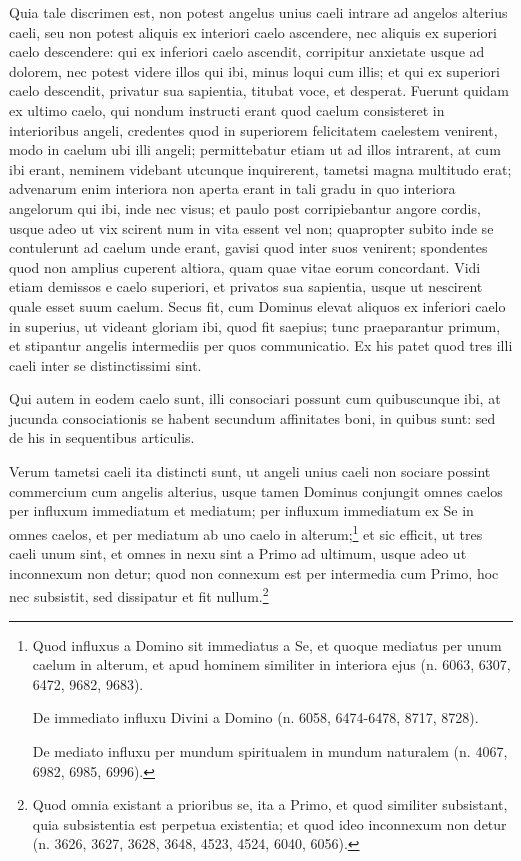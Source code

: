 \begin{topic}{35}
    Quia tale discrimen est, non potest angelus unius caeli intrare ad angelos alterius caeli, seu non potest aliquis ex
    interiori caelo ascendere, nec aliquis ex superiori caelo descendere: qui ex inferiori caelo ascendit, corripitur
    anxietate usque ad dolorem, nec potest videre illos qui ibi, minus loqui cum illis; et qui ex superiori caelo
    descendit, privatur sua sapientia, titubat voce, et desperat.
    Fuerunt quidam ex ultimo caelo, qui nondum instructi erant quod caelum consisteret in interioribus angeli, credentes
    quod in superiorem felicitatem caelestem venirent, modo in caelum ubi illi angeli; permittebatur etiam ut ad illos
    intrarent, at cum ibi erant, neminem videbant utcunque inquirerent, tametsi magna multitudo erat; advenarum enim
    interiora non aperta erant in tali gradu in quo interiora angelorum qui ibi, inde nec visus; et paulo post
    corripiebantur angore cordis, usque adeo ut vix scirent num in vita essent vel non; quapropter subito inde se
    contulerunt ad caelum unde erant, gavisi quod inter suos venirent; spondentes quod non amplius cuperent altiora,
    quam quae vitae eorum concordant.
    Vidi etiam demissos e caelo superiori, et privatos sua sapientia, usque ut nescirent quale esset suum caelum.
    Secus fit, cum Dominus elevat aliquos ex inferiori caelo in superius, ut videant gloriam ibi, quod fit saepius; tunc
    praeparantur primum, et stipantur angelis intermediis per quos communicatio.
    Ex his patet quod tres illi caeli inter se distinctissimi sint.
\end{topic}

\begin{topic}{36}
    Qui autem in eodem caelo sunt, illi consociari possunt cum quibuscunque ibi, at jucunda consociationis se habent
    secundum affinitates boni, in quibus sunt: sed de his in sequentibus articulis.
\end{topic}

\begin{topic}{37}
    Verum tametsi caeli ita distincti sunt, ut angeli unius caeli non sociare possint commercium cum angelis alterius,
    usque tamen Dominus conjungit omnes caelos per influxum immediatum et mediatum; per influxum immediatum ex Se in
    omnes caelos, et per mediatum ab uno caelo in alterum;\footnote{Quod influxus a Domino sit immediatus a Se, et
    quoque mediatus per unum caelum in alterum, et apud hominem similiter in interiora ejus (n. 6063, 6307, 6472, 9682,
    9683).

    De immediato influxu Divini a Domino (n. 6058, 6474-6478, 8717, 8728).

    De mediato influxu per mundum spiritualem in mundum naturalem (n. 4067, 6982, 6985, 6996).} et sic efficit, ut tres
    caeli unum sint, et omnes in nexu sint a Primo ad ultimum, usque adeo ut inconnexum non detur; quod non connexum est
    per intermedia cum Primo, hoc nec subsistit, sed dissipatur et fit nullum.\footnote{Quod omnia existant a prioribus
    se, ita a Primo, et quod similiter subsistant, quia subsistentia est perpetua existentia; et quod ideo inconnexum
    non detur (n. 3626, 3627, 3628, 3648, 4523, 4524, 6040, 6056).}
\end{topic}

